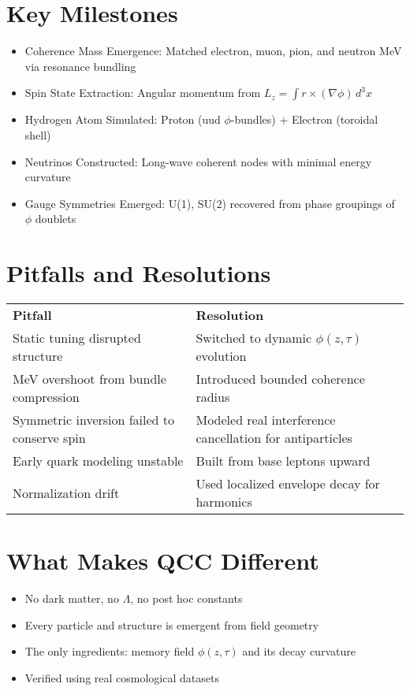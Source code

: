 \documentclass[12pt]{article}
\begin{document}
\section*{Key Milestones}
\begin{itemize}
\item Coherence Mass Emergence: Matched electron, muon, pion, and neutron MeV via resonance bundling
\item Spin State Extraction: Angular momentum from $L_z = \int r \times (\nabla \phi) \, d^3x$
\item Hydrogen Atom Simulated: Proton (uud $\phi$-bundles) + Electron (toroidal shell)
\item Neutrinos Constructed: Long-wave coherent nodes with minimal energy curvature
\item Gauge Symmetries Emerged: U(1), SU(2) recovered from phase groupings of $\phi$ doublets
\end{itemize}

\section*{Pitfalls and Resolutions}
\begin{tabular}{ll}
\textbf{Pitfall} & \textbf{Resolution} \\
Static tuning disrupted structure & Switched to dynamic $\phi(z, \tau)$ evolution \\
MeV overshoot from bundle compression & Introduced bounded coherence radius \\
Symmetric inversion failed to conserve spin & Modeled real interference cancellation for antiparticles \\
Early quark modeling unstable & Built from base leptons upward \\
Normalization drift & Used localized envelope decay for harmonics \\
\end{tabular}

\section*{What Makes QCC Different}
\begin{itemize}
\item No dark matter, no $\Lambda$, no post hoc constants
\item Every particle and structure is emergent from field geometry
\item The only ingredients: memory field $\phi(z, \tau)$ and its decay curvature
\item Verified using real cosmological datasets
\end{itemize}
\end{document}
